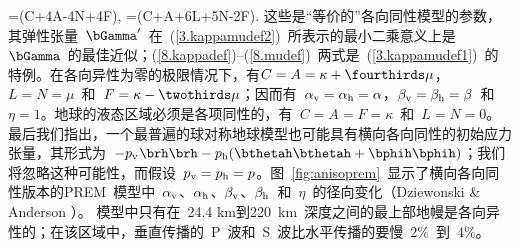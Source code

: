 {\kappa=\ninth(C+4A-4N+4F),
\en
\eq
\label{8.mudef}
\mu=\fifteenth(C+A+6L+5N-2F).
\en
这些是“等价的”各向同性模型的参数，
%
其弹性张量~$\bGamma'$~在~(\ref{3.kappamudef2})~所表示的最小二乘意义上是~$\bGamma$~的最佳近似；(\ref{8.kappadef})--(\ref{8.mudef})~两式是~(\ref{3.kappamudef1})~的特例。在各向异性为零的极限情况下，有$C=A=\kappa+\fourthirds\mu$，$L=N=\mu$~和~$F=\kappa-\twothirds\mu$；因而有~$\alpha_{\rm v}=\alpha_{\rm h}=\alpha$，$\beta_{\rm v}=\beta_{\rm h}=\beta$~和$\eta=1$。地球的液态区域必须是各项同性的，有~$C=A=F=\kappa$~和~$L=N=0$。最后我们指出，一个最普遍的球对称地球模型也可能具有横向各向同性的初始应力张量，其形式为~$-p_{\rm v}\hspace{0.2 mm}\brh\brh-p_{\rm h}(\bthetah\bthetah
+\bphih\bphih)$；我们将忽略这种可能性，而假设~$p_{\rm v}=p_{\rm h}=p$。图~\ref{fig:anisoprem}~显示了横向各向同性版本的PREM~模型中~$\alpha_{\rm v}$、$\alpha_{\rm h}$、$\beta_{\rm v}$、$\beta_{\rm h}$~和~$\eta$~的径向变化（Dziewonski \& Anderson \citeyear{dziewonski&anderson81}）。
%
模型中只有在~24.4 km到220~km~深度之间的最上部地幔是各向异性的；在该区域中，垂直传播的~P~波和~S~波比水平传播的要慢~$2\%$~到~$4\%$。

}
